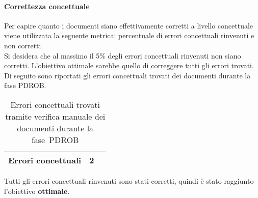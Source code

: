 \documentclass[../PianoDiQualifica.tex]{subfiles}
\begin{document}
\begin{appendices}
			\paragraph{Correttezza concettuale}
			Per capire quanto i documenti siano effettivamente corretti a livello concettuale viene utilizzata la seguente metrica: percentuale di errori concettuali rinvenuti e non corretti.\\
			Si desidera che al massimo il 5\% degli errori concettuali rinvenuti non siano corretti. L'obiettivo ottimale sarebbe quello di correggere tutti gli errori trovati. \\
			Di seguito sono riportati gli errori concettuali trovati dei documenti durante la fase PDROB.
			\begin{table}[H]
				\centering
				\begin{tabular}{l * {2}{c}}
					\midrule
					Errori concettuali & 2 \\
					\midrule
				\end{tabular}
				\caption{Errori concettuali trovati tramite verifica manuale dei documenti durante la fase\g\ PDROB}
				\label{tab:errori_concettuali}
			\end{table}
			Tutti gli errori concettuali rinvenuti sono stati corretti, quindi è stato raggiunto l'obiettivo \textbf{ottimale}.
			
\end{appendices}
\end{document}
